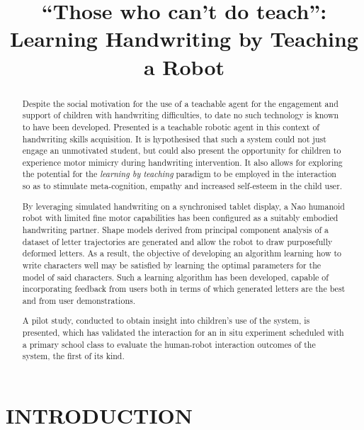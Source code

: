 \documentclass{sig-alternate}
\title{\LARGE \bf
``Those who can't do teach'': Learning Handwriting by Teaching a Robot
}
\begin{document}
\maketitle

\begin{abstract}

Despite the social motivation for the use of a teachable agent for the
engagement and support of children with handwriting difficulties, to date no
such technology is known to have been developed. Presented is a teachable
robotic agent in this context of handwriting skills acquisition. It is
hypothesised that such a system could not just engage an unmotivated student,
but could also present the opportunity for children to experience motor mimicry
during handwriting intervention. It also allows for exploring the potential for
the \emph{learning by teaching} paradigm to be employed in the interaction so as
to stimulate meta-cognition, empathy and increased self-esteem in the child
user. 

By leveraging simulated handwriting on a synchronised tablet display, a Nao
humanoid robot with limited fine motor capabilities has been configured as a
suitably embodied handwriting partner. Shape models derived from principal
component analysis of a dataset of letter trajectories are generated and allow
the robot to draw purposefully deformed letters. As a result, the objective of
developing an algorithm learning how to write characters well may be satisfied
by learning the optimal parameters for the model of said characters. Such a
learning algorithm has been developed, capable of incorporating feedback from
users both in terms of which generated letters are the best and from user
demonstrations. 

A pilot study, conducted to obtain insight into children's use of the system, is
presented, which has validated the interaction for an in situ experiment
scheduled with a primary school class to evaluate the human-robot interaction
outcomes of the system, the first of its kind. 

\end{abstract}


\section{INTRODUCTION}
\end{document}
